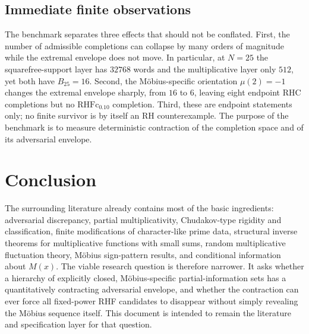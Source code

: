 \documentclass[11pt]{article}
\newcommand{\RHFc}{\mathrm{RHFc}}
\begin{document}
\subsection{Immediate finite observations}
The benchmark separates three effects that should not be conflated. First, the number of admissible completions can collapse by many orders of magnitude while the extremal envelope does not move. In particular, at $N=25$ the squarefree-support layer has $32768$ words and the multiplicative layer only $512$, yet both have $B_{25}=16$. Second, the Möbius-specific orientation $\mu(2)=-1$ changes the extremal envelope sharply, from $16$ to $6$, leaving eight endpoint RHC completions but no $\RHFc_{0.10}$ completion. Third, these are endpoint statements only; no finite survivor is by itself an RH counterexample. The purpose of the benchmark is to measure deterministic contraction of the completion space and of its adversarial envelope.


\section{Conclusion}
The surrounding literature already contains most of the basic ingredients: adversarial discrepancy, partial multiplicativity, Chudakov-type rigidity and classification, finite modifications of character-like prime data, structural inverse theorems for multiplicative functions with small sums, random multiplicative fluctuation theory, Möbius sign-pattern results, and conditional information about $M(x)$.  The viable research question is therefore narrower.  It asks whether a hierarchy of explicitly closed, Möbius-specific partial-information sets has a quantitatively contracting adversarial envelope, and whether the contraction can ever force all fixed-power RHF candidates to disappear without simply revealing the Möbius sequence itself.  This document is intended to remain the literature and specification layer for that question.
\end{document}
